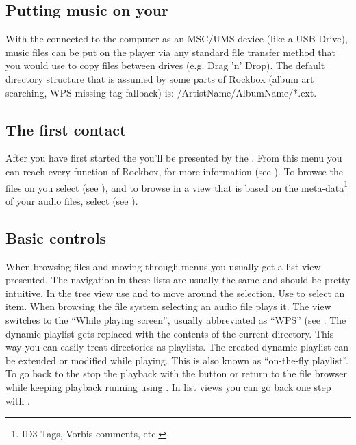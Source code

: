 \subsection{Putting music on your \dap{}}

With the \dap{} connected to the computer as an MSC/UMS device (like a 
USB Drive), music files can be put on the player via any standard file 
transfer method that you would use to copy files between drives (e.g. Drag 'n' Drop).
  The default directory structure that is assumed by some parts of Rockbox
  (album art searching, WPS missing-tag fallback) is: /ArtistName/AlbumName/*.ext.

\subsection{The first contact}

After you have first started the \dap{} you'll be presented by the
. From this menu you can reach every function of Rockbox,
for more information (see ). To browse the files
on you \dap{} select  (see ), and to
browse in a view that is based on the meta-data\footnote{ID3 Tags, Vorbis
comments, etc.} of your audio files, select  (see
).

\subsection{Basic controls}
When browsing files and moving through menus you usually get a list view
presented. The navigation in these lists are usually the same and should be
pretty intuitive.
In the tree view use \ActionStdNext{} and \ActionStdPrev{} to move around
the selection. Use \ActionStdOk{} to select an item. When browsing the file
system selecting an audio file plays it. The view switches to the ``While
playing screen'', usually abbreviated as ``WPS'' (see . The
dynamic playlist gets replaced with the contents of the current directory. This
way you can easily treat directories as playlists. The created dynamic playlist can
be extended or modified while playing. This is also known as
``on-the-fly playlist''.
To go back to the  stop the playback with the
\ActionWpsStop{} button or return to the file browser while keeping playback
running using \ActionWpsBrowse{}.
In list views you can go back one step with \ActionTreeParentDirectory.

